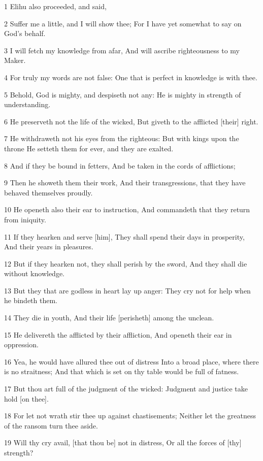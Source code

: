 \par 1 Elihu also proceeded, and said,
\par 2 Suffer me a little, and I will show thee; For I have yet somewhat to say on God's behalf.
\par 3 I will fetch my knowledge from afar, And will ascribe righteousness to my Maker.
\par 4 For truly my words are not false: One that is perfect in knowledge is with thee.
\par 5 Behold, God is mighty, and despiseth not any: He is mighty in strength of understanding.
\par 6 He preserveth not the life of the wicked, But giveth to the afflicted [their] right.
\par 7 He withdraweth not his eyes from the righteous: But with kings upon the throne He setteth them for ever, and they are exalted.
\par 8 And if they be bound in fetters, And be taken in the cords of afflictions;
\par 9 Then he showeth them their work, And their transgressions, that they have behaved themselves proudly.
\par 10 He openeth also their ear to instruction, And commandeth that they return from iniquity.
\par 11 If they hearken and serve [him], They shall spend their days in prosperity, And their years in pleasures.
\par 12 But if they hearken not, they shall perish by the sword, And they shall die without knowledge.
\par 13 But they that are godless in heart lay up anger: They cry not for help when he bindeth them.
\par 14 They die in youth, And their life [perisheth] among the unclean.
\par 15 He delivereth the afflicted by their affliction, And openeth their ear in oppression.
\par 16 Yea, he would have allured thee out of distress Into a broad place, where there is no straitness; And that which is set on thy table would be full of fatness.
\par 17 But thou art full of the judgment of the wicked: Judgment and justice take hold [on thee].
\par 18 For let not wrath stir thee up against chastisements; Neither let the greatness of the ransom turn thee aside.
\par 19 Will thy cry avail, [that thou be] not in distress, Or all the forces of [thy] strength?

